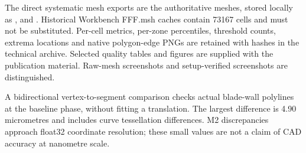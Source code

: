\documentclass[11pt,a4paper]{article}
\begin{document}
The direct systematic mesh exports are the authoritative meshes, stored locally as ,  and . Historical Workbench FFF.msh caches contain 73167 cells and must not be substituted. Per-cell metrics, per-zone percentiles, threshold counts, extrema locations and native polygon-edge PNGs are retained with hashes in the technical archive. Selected quality tables and figures are supplied with the publication material. Raw-mesh screenshots and setup-verified screenshots are distinguished.\par

A bidirectional vertex-to-segment comparison checks actual blade-wall polylines at the baseline phase, without fitting a translation. The largest difference is 4.90 micrometres and includes curve tessellation differences. M2 discrepancies approach float32 coordinate resolution; these small values are not a claim of CAD accuracy at nanometre scale.\par
\end{document}
